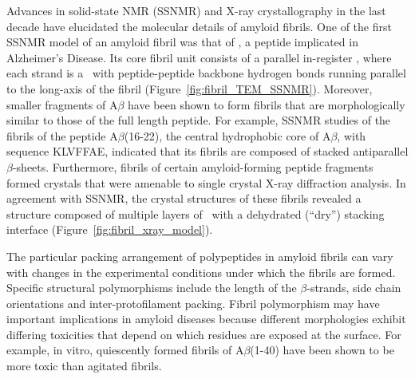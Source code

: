 
Advances in solid-state NMR (SSNMR) and X-ray crystallography in the last decade have elucidated the molecular details of amyloid fibrils. One of the first SSNMR model of an amyloid fibril was that of , a peptide implicated in Alzheimer's Disease.\cite{Petkova:2006gx}
Its core fibril unit consists of a parallel in-register \bsheet, where each strand is a \bhairpin\ with peptide-peptide backbone hydrogen bonds running parallel to the long-axis of the fibril (Figure~\ref{fig:fibril_TEM_SSNMR}).  Moreover, smaller fragments of A$\beta$ have been shown to form fibrils that are morphologically similar to those of the full length peptide. For example, SSNMR studies of the fibrils of the peptide A$\beta$(16-22), the central hydrophobic core of A$\beta$, with sequence KLVFFAE, indicated that its fibrils are composed of stacked antiparallel $\beta$-sheets.\cite{Balbach:2000vf} Furthermore, fibrils of certain amyloid-forming peptide fragments formed crystals that were amenable to single crystal X-ray diffraction analysis.\cite{Eisenberg:2012hm}  In agreement with SSNMR, the crystal structures of these fibrils revealed a structure composed of multiple layers of \bsheet\ with a dehydrated (``dry'') stacking interface (Figure~\ref{fig:fibril_xray_model}).\cite{Sawaya:2007p4363,Eisenberg:2012hm}

The particular packing arrangement of polypeptides in amyloid fibrils can vary with changes in the experimental conditions under which the fibrils are formed. Specific structural polymorphisms include the length of the $\beta$-strands, side chain orientations and inter-protofilament packing.\cite{Kodali:2007cz} Fibril polymorphism may have important implications in amyloid diseases because different morphologies exhibit differing toxicities that depend on which residues are exposed at the surface. For example, in vitro, quiescently formed fibrils of A$\beta$(1-40) have been shown to be more toxic than agitated fibrils.\cite{Petkova:2005p4688} 

